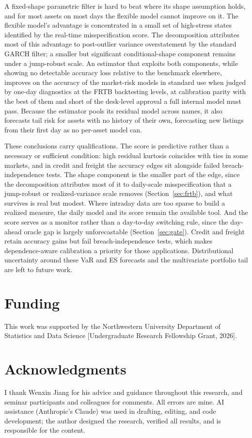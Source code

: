 \documentclass[11pt]{article}
\theoremstyle{remark}
\begin{document}
A fixed-shape parametric filter is hard to beat where its shape assumption holds, and for most assets on most days the flexible model cannot improve on it. The flexible model's advantage is concentrated in a small set of high-stress states identified by the real-time misspecification score. The decomposition attributes most of this advantage to post-outlier variance overstatement by the standard GARCH filter; a smaller but significant conditional-shape component remains under a jump-robust scale. An estimator that exploits both components, while showing no detectable accuracy loss relative to the benchmark elsewhere, improves on the accuracy of the market-risk models in standard use when judged by one-day diagnostics at the FRTB backtesting levels, at calibration parity with the best of them and short of the desk-level approval a full internal model must pass. Because the estimator pools its residual model across names, it also forecasts tail risk for assets with no history of their own, forecasting new listings from their first day as no per-asset model can.

These conclusions carry qualifications. The score is predictive rather than a necessary or sufficient condition: high residual kurtosis coincides with ties in some markets, and in credit and freight the accuracy edges sit alongside failed breach-independence tests. The shape component is the smaller part of the edge, since the decomposition attributes most of it to daily-scale misspecification that a jump-robust or realized-variance scale removes (Section~\ref{sec:frtb}), and what survives is real but modest. Where intraday data are too sparse to build a realized measure, the daily model and its score remain the available tool. And the score serves as a monitor rather than a day-to-day switching rule, since the day-ahead oracle gap is largely unforecastable (Section~\ref{sec:gate}). Credit and freight retain accuracy gains but fail breach-independence tests, which makes dependence-aware calibration a priority for those applications.
Distributional uncertainty around these VaR and ES forecasts and the multivariate portfolio tail are left to future work.

\section*{Funding}
This work was supported by the Northwestern University Department of
Statistics and Data Science [Undergraduate Research Fellowship Grant,
2026].

\section*{Acknowledgments}
I thank Wenxin Jiang for his advice and guidance throughout this
research, and seminar participants and colleagues for comments. All
errors are mine.
AI assistance (Anthropic's Claude) was used in drafting, editing, and
code development; the author designed the research, verified all
results, and is responsible for the content.
\end{document}
